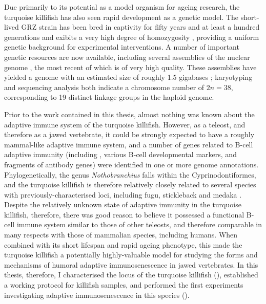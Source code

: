 Due primarily to its potential as a model organism for ageing research, the turquoise killifish has also seen rapid development as a genetic model. The short-lived GRZ strain has been bred in captivity for fifty years and at least a hundred generations \parencite{terzibasi2007review} and exibits a very high degree of homozygosity \parencite{kirschner2012map,reichwald2009genome,valenzano2009map}, providing a uniform genetic background for experimental interventions. A number of important genetic resources are now available, including several assemblies of the nuclear genome \parencite{reichwald2015genome,valenzano2015genome,willemsen2019popgen}, the most recent of which \parencite{willemsen2019popgen} is of very high quality. These assemblies have yielded a genome with an estimated size of roughly 1.5 gigabases \parencite{willemsen2019popgen};
karyotyping \parencite{reichwald2009genome} and sequencing analysis \parencite{reichwald2015genome} both indicate a chromosome number of $2n = 38$, corresponding to 19 distinct linkage groups in the haploid genome.

Prior to the work contained in this thesis, almost nothing was known about the adaptive immune system of the turquoise killifish. However, as a teleost, and therefore as a jawed vertebrate, it could be strongly expected to have a roughly mammal-like adaptive immune system, and a number of genes related to B-cell adaptive immunity (including , various B-cell developmental markers, and fragments of antibody genes) were identified in one or more genome annotations. Phylogenetically, the genus \textit{Nothobranchius} falls within the Cyprinodontiformes, and the turquoise killifish is therefore relatively closely related to several species with previously-characterised \igh{} loci, including fugu, stickleback and medaka \parencite{terzibasi2007review,hughes2018teleostphylo}. Despite the relatively unknown state of adaptive immunity in the turquoise killifish, therefore, there was good reason to believe it possessed a functional B-cell immune system similar to those of other teleosts, and therefore comparable in many respects with those of mammalian species, including humans. When combined with its short lifespan and rapid ageing phenotype, this made the turquoise killifish a potentially highly-valuable model for studying the forms and mechanisms of humoral adaptive immunosenescence in jawed vertebrates. %
In this thesis, therefore, I characterised the \igh{} locus of the turquoise killifish (), established a working \Igseq protocol for killifish samples, and performed the first experiments investigating adaptive immunosenescence in this species (). %

